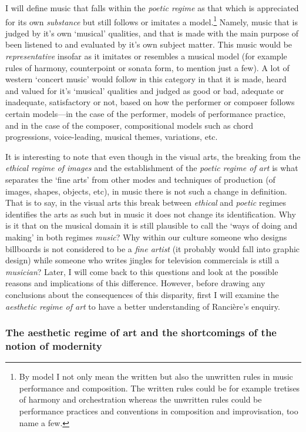I will define music that falls within the \emph{poetic regime} as that which is appreciated for its own \emph{substance} but still follows or imitates a model.\footnote{By model I not only mean the written but also the unwritten rules in music performance and composition. The written rules could be for example tretises of harmony and orchestration whereas the unwritten rules could be performance practices and conventions in composition and improvisation, too name a few.} Namely, music that is judged by it's own `musical' qualities, and that is made with the main purpose of been listened to and evaluated by it's own subject matter. This music would be \emph{representative} insofar as it imitates or resembles a musical model (for example rules of harmony, counterpoint or sonata form, to mention just a few). A lot of western `concert music' would follow in this category in that it is made, heard and valued for it's `musical' qualities and judged as good or bad, adequate or inadequate, satisfactory or not, based on how the performer or composer follows certain models---in the case of the performer, models of performance practice, and in the case of the composer, compositional models such as chord progressions, \mbox{voice-leading}, musical themes, variations, etc. 

It is interesting to note that even though in the visual arts, the breaking from the \emph{ethical regime of images} and the establishment of the \emph{poetic regime of art} is what separates the `fine arts' from other modes and techniques of production (of images, shapes, objects, etc), in music there is not such a change in definition. That is to say, in the visual arts this break between \emph{ethical} and \emph{poetic} regimes identifies the arts as such but in music it does not change its identification. Why is it that on the musical domain it is still plausible to call the `ways of doing and making' in both regimes \emph{music}? Why within our culture someone who designs billboards is not considered to be a \emph{fine artist} (it probably would fall into graphic design) while someone who writes jingles for television commercials is still a \emph{musician}? Later, I will come back to this questions and look at the possible reasons and implications of this difference. However, before drawing any conclusions about the consequences of this disparity, first I will examine the \emph{aesthetic regime of art} to have a better understanding of Ranci\`{e}re's enquiry.

\subsubsection{The aesthetic regime of art and the shortcomings of the notion of modernity}

